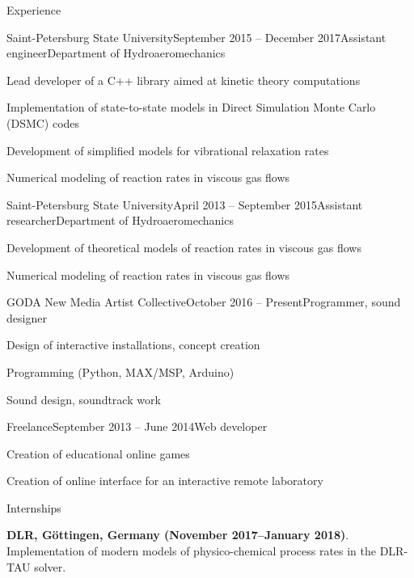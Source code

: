 \documentclass{resume} %
\begin{document}

\begin{rSection}{Experience}


\begin{rSubsection}{Saint-Petersburg State University}{September 2015 -- December 2017}{Assistant engineer}{Department of Hydroaeromechanics}
\item Lead developer of a C++ library aimed at kinetic theory computations
\item Implementation of state-to-state models in Direct Simulation Monte Carlo (DSMC) codes
\item Development of simplified models for vibrational relaxation rates
\item Numerical modeling of reaction rates in viscous gas flows
\end{rSubsection}

\begin{rSubsection}{Saint-Petersburg State University}{April 2013 -- September 2015}{Assistant researcher}{Department of Hydroaeromechanics}
\item Development of theoretical models of reaction rates in viscous gas flows
\item Numerical modeling of reaction rates in viscous gas flows
\end{rSubsection}

\begin{rSubsection}{GODA New Media Artist Collective}{October 2016 -- Present}{Programmer, sound designer}{}
\item Design of interactive installations, concept creation
\item Programming (Python, MAX/MSP, Arduino)
\item Sound design, soundtrack work
\end{rSubsection}

\begin{rSubsection}{Freelance}{September 2013 -- June 2014}{Web developer}{}
\item Creation of educational online games
\item Creation of online interface for an interactive remote laboratory
\end{rSubsection}

\begin{rSubsection}{Internships}{}{}{}
\item \textbf{DLR, Göttingen, Germany (November 2017--January 2018)}.
Implementation of modern models of physico-chemical process rates in the DLR-TAU solver.


\end{rSubsection}
\end{rSection}
\end{document}
